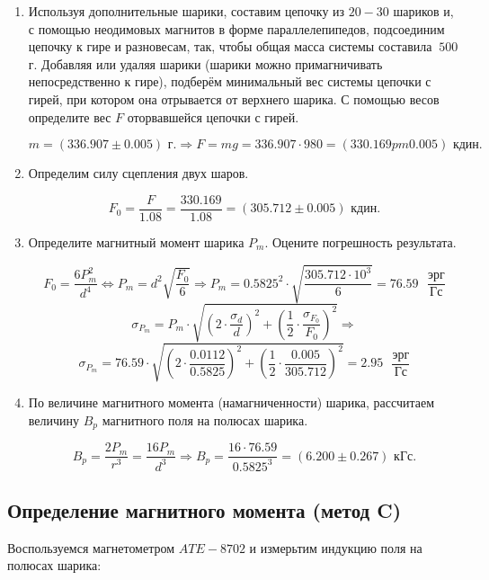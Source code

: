 \documentclass[a4paper,12pt]{article} %
\begin{document}
\begin{enumerate}
    \item Используя дополнительные шарики, составим цепочку из $20-30$ шариков и, с помощью неодимовых магнитов в форме параллелепипедов, подсоединим цепочку к гире и разновесам, так, чтобы общая масса системы составила $~ 500$ г. Добавляя или удаляя шарики (шарики можно примагничивать непосредственно к гире), подберём минимальный вес системы цепочки с гирей, при котором она отрывается от верхнего шарика. С помощью весов определите вес $F$ оторвавшейся цепочки с гирей.

    \[ m = (336.907 \pm 0.005) \text{ г.} \Longrightarrow F = mg = 336.907 \cdot 980 = (330.169 pm 0.005) \text{ кдин.} \]

    \item Определим силу сцепления двух шаров.

    \[ F_0 = \frac{F}{1.08} = \frac{330.169}{1.08} = (305.712 \pm 0.005) \text{ кдин.} \]

    \item Определите магнитный момент шарика $P_m$. Оцените погрешность результата.

    \[ F_0 = \frac{6P_m^2}{d^4} \Longleftrightarrow P_m = d^2\sqrt{\frac{F_0}{6}} \Longrightarrow P_m = 0.5825^2 \cdot \sqrt{\frac{305.712 \cdot 10^3}{6}} = 76.59 \text{ }\frac{\text{эрг}}{\text{Гс}} \]
    \[ \sigma_{P_m} = P_m\cdot\sqrt{\left(2\cdot\frac{\sigma_{d}}{d}\right)^2 + \left(\frac{1}{2}\cdot\frac{\sigma_{F_0}}{F_0}\right)^2} \Longrightarrow \] 
    \[ \sigma_{P_m} = 76.59\cdot\sqrt{\left(2\cdot\frac{0.0112}{0.5825}\right)^2 + \left(\frac{1}{2}\cdot\frac{0.005}{305.712}\right)^2} = 2.95 \text{ }\frac{\text{эрг}}{\text{Гс}} \]

    \item По величине магнитного момента (намагниченности) шарика, рассчитаем величину $B_p$ магнитного поля на полюсах шарика.

    \[ B_p = \frac{2P_m}{r^3} = \frac{16P_m}{d^3} \Longrightarrow B_p = \frac{16\cdot76.59}{0.5825^3} = (6.200 \pm 0.267) \text{ кГс.} \]
\end{enumerate}

\subsection{Определение магнитного момента (метод C)}

Воспользуемся магнетометром $ATE-8702$ и измерьтим индукцию поля на полюсах шарика:
\end{document}
